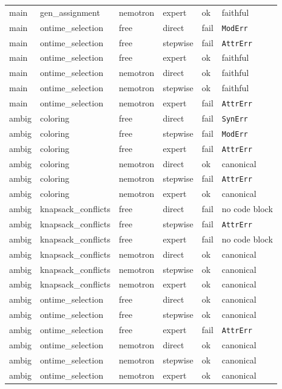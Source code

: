 \documentclass[pdflatex,sn-mathphys-num]{sn-jnl}
\theoremstyle{thmstyleone}
\theoremstyle{thmstyletwo}
\begin{document}
\begin{appendices}
\begin{table}[h]
\begin{tabular}{llllll}
main & gen\_assignment & nemotron & expert & ok & faithful\\
main & ontime\_selection & free & direct & fail & \texttt{ModErr}\\
main & ontime\_selection & free & stepwise & fail & \texttt{AttrErr}\\
main & ontime\_selection & free & expert & ok & faithful\\
main & ontime\_selection & nemotron & direct & ok & faithful\\
main & ontime\_selection & nemotron & stepwise & ok & faithful\\
main & ontime\_selection & nemotron & expert & fail & \texttt{AttrErr}\\
\midrule
ambig & coloring & free & direct & fail & \texttt{SynErr}\\
ambig & coloring & free & stepwise & fail & \texttt{ModErr}\\
ambig & coloring & free & expert & fail & \texttt{AttrErr}\\
ambig & coloring & nemotron & direct & ok & canonical\\
ambig & coloring & nemotron & stepwise & fail & \texttt{AttrErr}\\
ambig & coloring & nemotron & expert & ok & canonical\\
ambig & knapsack\_conflicts & free & direct & fail & no code block\\
ambig & knapsack\_conflicts & free & stepwise & fail & \texttt{AttrErr}\\
ambig & knapsack\_conflicts & free & expert & fail & no code block\\
ambig & knapsack\_conflicts & nemotron & direct & ok & canonical\\
ambig & knapsack\_conflicts & nemotron & stepwise & ok & canonical\\
ambig & knapsack\_conflicts & nemotron & expert & ok & canonical\\
ambig & ontime\_selection & free & direct & ok & canonical\\
ambig & ontime\_selection & free & stepwise & ok & canonical\\
ambig & ontime\_selection & free & expert & fail & \texttt{AttrErr}\\
ambig & ontime\_selection & nemotron & direct & ok & canonical\\
ambig & ontime\_selection & nemotron & stepwise & ok & canonical\\
ambig & ontime\_selection & nemotron & expert & ok & canonical\\
\bottomrule
\end{tabular}
\end{table}

\end{appendices}


\end{document}
